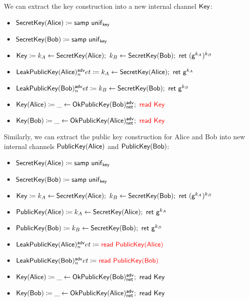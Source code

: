 \noindent We can extract the key construction into a new internal channel $\mathsf{Key}$:

\begin{itemize}
\item $\mathsf{SecretKey}(\mathsf{Alice}) \coloneqq \mathsf{samp} \ \mathsf{unif}_{\mathsf{key}}$
\item $\mathsf{SecretKey}(\mathsf{Bob}) \coloneqq \mathsf{samp} \ \mathsf{unif}_{\mathsf{key}}$
\item {\color{red} $\Key \coloneqq k_A \leftarrow \SecretKey(\Alice); \ k_B \leftarrow \SecretKey(\Bob); \ \ret{(\gen^{k_A})^{k_B}}$}
\item $\LeakPublicKey(\Alice)^\adv_net \coloneqq k_A \leftarrow \SecretKey(\Alice); \ \ret{\gen^{k_A}}$
\item $\LeakPublicKey(\Bob)^\adv_net \coloneqq k_B \leftarrow \SecretKey(\Bob); \ \ret{\gen^{k_B}}$
\item $\mathsf{Key}(\mathsf{Alice}) \coloneqq \_ \leftarrow \mathsf{OkPublicKey}(\mathsf{Bob})^{\mathsf{adv}}_{\mathsf{net}}; \ {\color{red} \mathsf{read} \ \mathsf{Key}}$
\item $\mathsf{Key}(\mathsf{Bob}) \coloneqq \_ \leftarrow \mathsf{OkPublicKey}(\mathsf{Alice})^{\mathsf{adv}}_{\mathsf{net}}; \ {\color{red} \mathsf{read} \ \mathsf{Key}}$
\end{itemize}

\noindent Similarly, we can extract the public key construction for Alice and Bob into new internal channels $\mathsf{PublicKey}(\mathsf{Alice})$ and $\mathsf{PublicKey}(\mathsf{Bob})$:

\begin{itemize}
\item $\mathsf{SecretKey}(\mathsf{Alice}) \coloneqq \mathsf{samp} \ \mathsf{unif}_{\mathsf{key}}$
\item $\mathsf{SecretKey}(\mathsf{Bob}) \coloneqq \mathsf{samp} \ \mathsf{unif}_{\mathsf{key}}$
\item $\Key \coloneqq k_A \leftarrow \SecretKey(\Alice); \ k_B \leftarrow \SecretKey(\Bob); \ \ret{(\gen^{k_A})^{k_B}}$
\item {\color{red} $\PublicKey(\Alice) \coloneqq k_A \leftarrow \SecretKey(\Alice); \ \ret{\gen^{k_A}}$}
\item {\color{red} $\mathsf{PublicKey}(\mathsf{Bob}) \coloneqq k_B \leftarrow \mathsf{SecretKey}(\mathsf{Bob}); \ \mathsf{ret} \ \mathsf{g}^{k_B}$}
\item $\mathsf{LeakPublicKey}(\mathsf{Alice})^{\mathsf{adv}}_net \coloneqq {\color{red} \mathsf{read} \ \mathsf{PublicKey}(\mathsf{Alice})}$
\item $\mathsf{LeakPublicKey}(\mathsf{Bob})^{\mathsf{adv}}_net \coloneqq {\color{red} \mathsf{read} \ \mathsf{PublicKey}(\mathsf{Bob})}$
\item $\mathsf{Key}(\mathsf{Alice}) \coloneqq \_ \leftarrow \mathsf{OkPublicKey}(\mathsf{Bob})^{\mathsf{adv}}_{\mathsf{net}}; \ \mathsf{read} \ \mathsf{Key}$
\item $\mathsf{Key}(\mathsf{Bob}) \coloneqq \_ \leftarrow \mathsf{OkPublicKey}(\mathsf{Alice})^{\mathsf{adv}}_{\mathsf{net}}; \ \mathsf{read} \ \mathsf{Key}$
\end{itemize}

